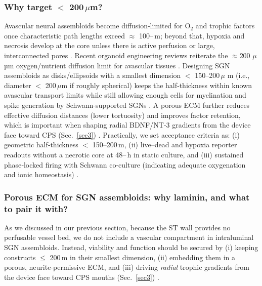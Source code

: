 \documentclass[referee,pdflatex, sn-vancouver-num]{sn-jnl}%
\theoremstyle{thmstyleone}%
\theoremstyle{thmstyletwo}%
\theoremstyle{thmstylethree}%
\DeclareRobustCommand{\textendash}{\ifmmode\text{-}\else\leavevmode\hbox{--}\fi}
\begin{document}
\subsubsection{Why target \texorpdfstring{$<$ 200\,$\mu$m}{< 200 µm}? }
Avascular neural assembloids become diffusion‑limited for O$_2$ and trophic factors once characteristic path lengths exceed $\approx$ 100\textendash200\,\textmu m; beyond that, hypoxia and necrosis develop at the core unless there is active perfusion or large, interconnected pores \citep{Grimes2014SpheroidOxygen,Rouwkema2008Vascularization,MuellerKlieser1987Spheroids}. 
Recent organoid engineering reviews reiterate the $\approx$200 $\mu$µm oxygen/nutrient diffusion limit for avascular tissues \cite{Chen2024_NatRevBioeng}. Designing SGN assembloids as disks/ellipsoids with a smallest dimension $<$ 150–200\,$\mu$ m (i.e., diameter $<$ 200\,$\mu$m if roughly spherical) keeps the half‑thickness within known avascular transport limits while still allowing enough cells for myelination and spike generation by Schwann‑supported SGNs \citep{Oliveira2023FrontiersPN,Moss2024iScience}. A porous ECM further reduces effective diffusion distances (lower tortuosity) and improves factor retention, which is important when shaping radial BDNF/NT‑3 gradients from the device face toward CPS (Sec.~\ref{sec3}) \citep{SandovalCastellanos2020HeparinBDNF,Nella2022NeurotrophinGradients,Leake2013}. Practically, we set acceptance criteria as: (i) geometric half‑thickness $<$ 150–200\,\textmu m, (ii) live–dead and hypoxia reporter readouts without a necrotic core at 48\textendash 72\,h in static culture, and (iii) sustained phase‑locked firing with Schwann co‑culture (indicating adequate oxygenation and ionic homeostasis) \citep{Xia2023StemCellReports}.

\subsubsection{Porous ECM for SGN assembloids: why laminin, and what to pair it with?}
As we discussed in our previous section, because the ST wall provides no perfusable vessel bed, we do not include a vascular compartment in intraluminal SGN assembloids. Instead, viability and function should be secured by (i) keeping constructs $\leq$ 200\,\textmu m in their smallest dimension, (ii) embedding them in a porous, neurite‑permissive ECM, and (iii) driving \emph{radial} trophic gradients from the device face toward CPS mouths (Sec.~\ref{sec3}) \citep{Nella2022NeurotrophinGradients,Leake2013,Evans2009-cm,SandovalCastellanos2020HeparinBDNF}. 
\end{document}
